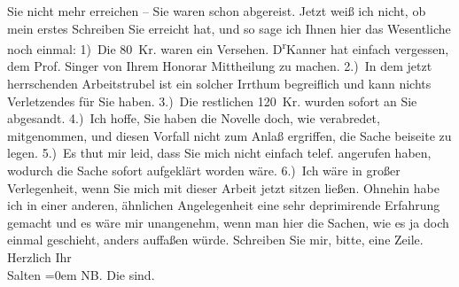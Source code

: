 \begin{ledgroupsized}[t]{13cm}
               Sie nicht mehr erreichen – Sie waren schon abgereist. Jetzt weiß ich nicht, ob mein
               erstes Schreiben Sie erreicht hat, und so sage ich Ihnen hier das Wesentliche noch
               einmal: 1) Die 80 Kr. waren ein Versehen. D\textsuperscript{r}Kanner hat einfach vergessen, dem Prof. Singer von Ihrem Honorar Mittheilung zu machen.
               2.) In dem jetzt herrschenden Arbeitstrubel ist ein solcher Irrthum begreiflich
               und kann nichts Verletzendes für Sie haben. 3.) Die restlichen 120 Kr.
               wurden sofort an Sie abgesandt. 4.) Ich hoffe, Sie haben die Novelle doch, wie verabredet, mitgenommen,
               und diesen Vorfall nicht zum Anlaß ergriffen, die Sache beiseite zu legen.
               5.) Es thut mir leid, dass Sie mich nicht einfach telef. angerufen haben,
               wodurch die Sache sofort aufgeklärt worden wäre. 6.) Ich wäre in großer
               Verlegenheit, wenn Sie mich mit dieser Arbeit jetzt sitzen ließen. \pend
           \pstart
           Ohnehin habe ich in einer anderen, ähnlichen Angelegenheit eine sehr deprimirende
               Erfahrung gemacht und es wäre mir unangenehm, wenn man hier die Sachen, wie es ja
               doch einmal geschieht, anders auffaßen würde. Schreiben Sie mir, bitte, eine Zeile. \pend
           \pstart
           Herzlich Ihr {\\[\baselineskip]}\spacefill\mbox{Salten}\pend
           \leftskip=0em{}\pstart
           \noindent{}NB. Die \label{K_L03334-3333v}\label{K_L03334-3333h} sind.
               \pend
           
         
         \endnumbering{}\end{ledgroupsized}\begin{anhang}\end{anhang}\newcommand{\dateiname}{L03334}\newcommand{\titel}{Felix Salten an Arthur Schnitzler, 4. 9. 1902}\newcommand{\editorInnen}{Martin Anton Müller und Laura Untner}
      